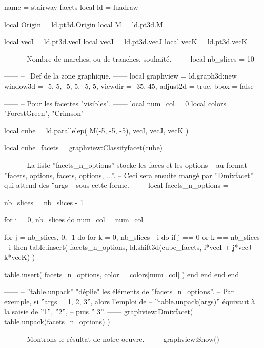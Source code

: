 \documentclass[border = 3pt]{standalone}
\begin{document}
\begin{luadraw*}{name = stairway-facets}
local ld = luadraw

local Origin = ld.pt3d.Origin
local M      = ld.pt3d.M

local vecI = ld.pt3d.vecI
local vecJ = ld.pt3d.vecJ
local vecK = ld.pt3d.vecK

------
-- Nombre de marches, ou de tranches, souhaité.
------
local nb_slices = 10

------
-- ¨Def de la zone graphique.
------
local graphview = ld.graph3d:new{
  window3d = {-5, 5, -5, 5, -5, 5},
  viewdir  = {-35, 45},
  adjust2d = true,
  bbox     = false
}

------
-- Pour les facettes "visibles".
------
local num_col = 0
local colors  = {"ForestGreen", "Crimson"}

local cube = ld.parallelep(
  M(-5, -5, -5),
  vecI, vecJ, vecK
)

local cube_facets = graphview:Classifyfacet(cube)

------
-- La liste ''facets_n_options'' stocke les faces et les options
-- au format ''{facets, options, facets, options, ...}''.
-- Ceci sera ensuite mangé par ''Dmixfacet'' qui attend des ¨args
-- sous cette forme.
------
local facets_n_options = {}

nb_slices = nb_slices - 1

for i = 0, nb_slices do
  num_col = num_col %

  for j = nb_slices, 0, -1 do
    for k = 0, nb_slices - i do
      if j == 0 or k == nb_slices - i then
        table.insert(
          facets_n_options,
          ld.shift3d(cube_facets, i*vecI + j*vecJ + k*vecK)
        )

        table.insert(
          facets_n_options,
          {
            color = colors[num_col]
          }
        )
      end
    end
  end
end

------
-- ''table.unpack'' "déplie" les éléments de ''facets_n_options''.
-- Par exemple, si ''args = {1, 2, 3}'', alors l'emploi de
-- ''table.unpack(args)'' équivaut à la saisie de ''1'', ''2'',
-- puis '' 3''.
------
graphview:Dmixfacet(
  table.unpack(facets_n_options)
)

------
-- Montrons le résultat de notre oeuvre.
------
graphview:Show()
\end{luadraw*}
\end{document}
